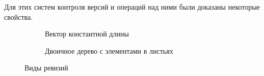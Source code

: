 Для этих систем контроля версий и операций над ними были доказаны
некоторые свойства.

\begin{figure}
  \centering
  \begin{subfigure}[b]{0.45\textwidth}
    \centering
    \caption{Вектор константной длины}
    \label{fig:repotypes-vec}
  \end{subfigure}
  \begin{subfigure}[b]{0.45\textwidth}
    \centering
    \caption{Двоичное дерево с элементами в листьях}
    \label{fig:repotypes-tree}
  \end{subfigure}
  \caption{Виды ревизий}
  \label{fig:repotypes}
\end{figure}

